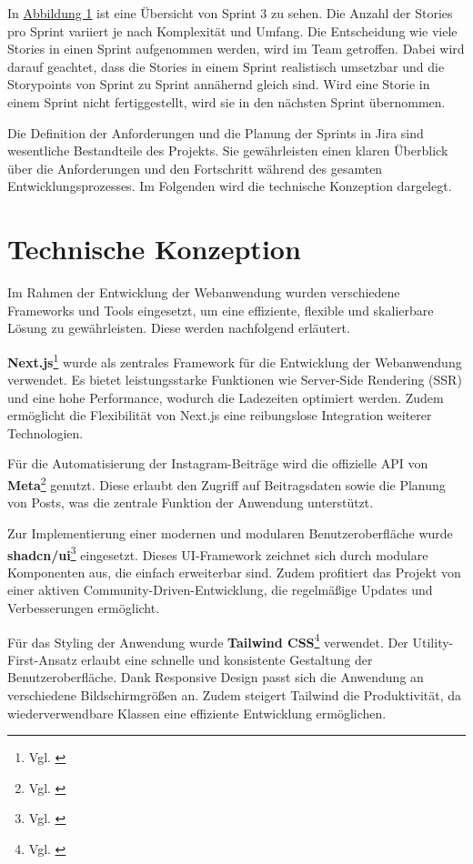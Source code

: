 In \hyperref[fig:fig-1]{Abbildung 1} ist eine Übersicht von Sprint 3 zu sehen. Die Anzahl der Stories pro Sprint variiert je nach Komplexität und Umfang.
Die Entscheidung wie viele Stories in einen Sprint aufgenommen werden, wird im Team getroffen. Dabei wird darauf geachtet, dass die Stories in einem Sprint
realistisch umsetzbar und die Storypoints von Sprint zu Sprint annähernd gleich sind. Wird eine Storie in einem Sprint nicht fertiggestellt, wird sie in
den nächsten Sprint übernommen.

Die Definition der Anforderungen und die Planung der Sprints in Jira sind wesentliche Bestandteile des Projekts. Sie gewährleisten einen klaren Überblick über die 
Anforderungen und den Fortschritt während des gesamten Entwicklungsprozesses. Im Folgenden wird die technische Konzeption dargelegt.

\section{Technische Konzeption}
\label{sec:chapter2-1}

Im Rahmen der Entwicklung der Webanwendung wurden verschiedene Frameworks und Tools eingesetzt, um eine effiziente, flexible und 
skalierbare Lösung zu gewährleisten. Diese werden nachfolgend erläutert.

\textbf{Next.js}\footnote{Vgl. \cite{nextjs_docs}} wurde als zentrales Framework für die Entwicklung der Webanwendung verwendet. Es bietet leistungsstarke Funktionen wie Server-Side Rendering (SSR) 
und eine hohe Performance, wodurch die Ladezeiten optimiert werden. Zudem ermöglicht die Flexibilität von Next.js eine reibungslose Integration weiterer Technologien.

Für die Automatisierung der Instagram-Beiträge wird die offizielle \ac{API} von \textbf{Meta}\footnote{Vgl. \cite{facebook_graph_api}} genutzt. Diese erlaubt den Zugriff auf Beitragsdaten sowie die Planung von 
Posts, was die zentrale Funktion der Anwendung unterstützt.

Zur Implementierung einer modernen und modularen Benutzeroberfläche wurde \textbf{shadcn/ui}\footnote{Vgl. \cite{shadcn_ui_docs}} eingesetzt. Dieses UI-Framework zeichnet sich durch modulare Komponenten 
aus, die einfach erweiterbar sind. Zudem profitiert das Projekt von einer aktiven Community-Driven-Entwicklung, die regelmäßige Updates und Verbesserungen ermöglicht.

Für das Styling der Anwendung wurde \textbf{Tailwind CSS}\footnote{Vgl. \cite{tailwindcss_v2_docs}} verwendet. Der Utility-First-Ansatz erlaubt eine schnelle und konsistente Gestaltung der Benutzeroberfläche. Dank 
Responsive Design passt sich die Anwendung an verschiedene Bildschirmgrößen an. Zudem steigert Tailwind die Produktivität, da wiederverwendbare Klassen eine 
effiziente Entwicklung ermöglichen.

